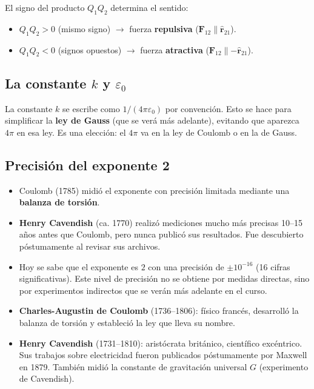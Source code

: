 \documentclass[12pt,a4paper]{article}
\begin{document}
El signo del producto $Q_1 Q_2$ determina el sentido:
\begin{itemize}[nosep]
  \item $Q_1 Q_2 > 0$ (mismo signo) $\to$ fuerza \textbf{repulsiva} ($\mathbf{F}_{12} \parallel \hat{\mathbf{r}}_{21}$).
  \item $Q_1 Q_2 < 0$ (signos opuestos) $\to$ fuerza \textbf{atractiva} ($\mathbf{F}_{12} \parallel -\hat{\mathbf{r}}_{21}$).
\end{itemize}

\subsection{La constante $k$ y $\varepsilon_0$}

La constante $k$ se escribe como $1/(4\pi\varepsilon_0)$ por convención. Esto se hace para simplificar la \textbf{ley de Gauss} (que se verá más adelante), evitando que aparezca $4\pi$ en esa ley. Es una elección: el $4\pi$ va en la ley de Coulomb o en la de Gauss.

\subsection{Precisión del exponente 2}

\begin{itemize}[nosep]
  \item Coulomb (1785) midió el exponente con precisión limitada mediante una \textbf{balanza de torsión}.
  \item \textbf{Henry Cavendish} (ca. 1770) realizó mediciones mucho más precisas 10--15 años antes que Coulomb, pero nunca publicó sus resultados. Fue descubierto póstumamente al revisar sus archivos.
  \item Hoy se sabe que el exponente es $2$ con una precisión de $\pm 10^{-16}$ (16 cifras significativas). Este nivel de precisión no se obtiene por medidas directas, sino por experimentos indirectos que se verán más adelante en el curso.
\end{itemize}

\begin{refbox}
\begin{itemize}[nosep]
  \item \textbf{Charles-Augustin de Coulomb} (1736--1806): físico francés, desarrolló la balanza de torsión y estableció la ley que lleva su nombre.
  \item \textbf{Henry Cavendish} (1731--1810): aristócrata británico, científico excéntrico. Sus trabajos sobre electricidad fueron publicados póstumamente por Maxwell en 1879. También midió la constante de gravitación universal $G$ (experimento de Cavendish).
\end{itemize}
\end{refbox}
\end{document}
